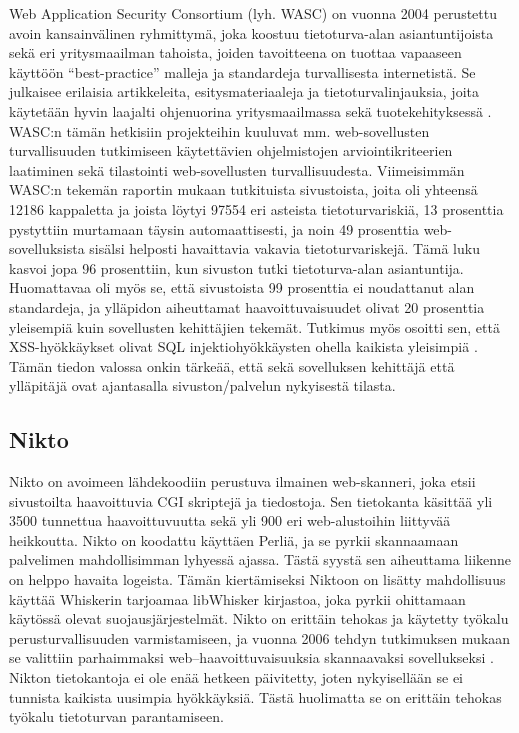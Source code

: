 Web Application Security Consortium (lyh. WASC) on vuonna 2004 perustettu avoin kansainvälinen ryhmittymä, joka koostuu tietoturva-alan asiantuntijoista sekä eri 
yritysmaailman tahoista, joiden tavoitteena on tuottaa vapaaseen käyttöön ``best-practice'' malleja ja standardeja turvallisesta internetistä. Se julkaisee
erilaisia artikkeleita, esitysmateriaaleja ja tietoturvalinjauksia, joita käytetään hyvin laajalti ohjenuorina yritysmaailmassa sekä tuotekehityksessä \cite{WASC}.
WASC:n tämän hetkisiin projekteihin kuuluvat mm. web-sovellusten turvallisuuden tutkimiseen käytettävien ohjelmistojen arviointikriteerien laatiminen sekä tilastointi
web-sovellusten turvallisuudesta. Viimeisimmän WASC:n tekemän raportin mukaan tutkituista sivustoista, joita oli yhteensä 12186 kappaletta ja joista löytyi 97554 
eri asteista tietoturvariskiä, 13 prosenttia pystyttiin murtamaan täysin automaattisesti, ja noin 49 prosenttia web-sovelluksista sisälsi helposti havaittavia vakavia 
tietoturvariskejä. Tämä luku kasvoi jopa 96 prosenttiin, kun sivuston tutki tietoturva-alan asiantuntija. Huomattavaa oli myös se, että sivustoista 99 prosenttia
ei noudattanut alan standardeja, ja ylläpidon aiheuttamat haavoittuvaisuudet olivat 20 prosenttia yleisempiä kuin sovellusten kehittäjien tekemät. Tutkimus myös 
osoitti sen, että XSS-hyökkäykset olivat SQL injektiohyökkäysten ohella kaikista yleisimpiä \cite{WASCb}. Tämän tiedon valossa onkin tärkeää, että sekä sovelluksen
kehittäjä että ylläpitäjä ovat ajantasalla sivuston/palvelun nykyisestä tilasta. 

\subsection{Nikto}

Nikto \cite{Nikto} on avoimeen lähdekoodiin perustuva ilmainen web-skanneri, joka etsii sivustoilta haavoittuvia CGI skriptejä ja tiedostoja. Sen tietokanta käsittää
yli 3500 tunnettua haavoittuvuutta sekä yli 900 eri web-alustoihin liittyvää heikkoutta. Nikto on koodattu käyttäen Perliä, ja se pyrkii skannaamaan palvelimen 
mahdollisimman lyhyessä ajassa. Tästä syystä sen aiheuttama liikenne on helppo havaita logeista. Tämän kiertämiseksi Niktoon on lisätty mahdollisuus käyttää Whiskerin
tarjoamaa libWhisker kirjastoa, joka pyrkii ohittamaan käytössä olevat suojausjärjestelmät. Nikto on erittäin tehokas ja käytetty työkalu perusturvallisuuden 
varmistamiseen, ja vuonna 2006 tehdyn tutkimuksen mukaan se valittiin parhaimmaksi web--haavoittuvaisuuksia skannaavaksi sovellukseksi \cite{INS}.
Nikton tietokantoja ei ole enää hetkeen päivitetty, joten nykyisellään se ei tunnista kaikista uusimpia hyökkäyksiä. Tästä huolimatta se on erittäin tehokas työkalu 
tietoturvan parantamiseen.

